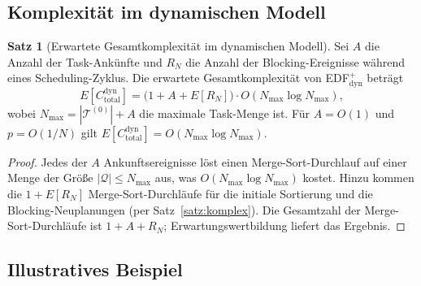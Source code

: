 ﻿\documentclass[a4paper,12pt]{article}
\theoremstyle{definition}
\newtheorem{satz}{Satz}
\begin{document}
	\subsection{Komplexität im dynamischen Modell}

	\begin{satz}[Erwartete Gesamtkomplexität im dynamischen Modell]
		\label{satz:komplex_dyn}
		Sei $A$ die Anzahl der Task-Ankünfte und $R_N$ die Anzahl der Blocking-Ereignisse
		während eines Scheduling-Zyklus. Die erwartete Gesamtkomplexität von
		EDF$^+_{\mathrm{dyn}}$ beträgt
		\[
		E[C_{\mathrm{total}}^{\mathrm{dyn}}] = \bigl(1 + A + E[R_N]\bigr) \cdot O(N_{\max}\log N_{\max}),
		\]
		wobei $N_{\max} = |\mathcal{T}^{(0)}| + A$ die maximale Task-Menge ist.
		Für $A = O(1)$ und $p = O(1/N)$ gilt
		$E[C_{\mathrm{total}}^{\mathrm{dyn}}] = O(N_{\max}\log N_{\max})$.
	\end{satz}

	\begin{proof}
		Jedes der $A$ Ankunftsereignisse löst einen Merge-Sort-Durchlauf auf einer
		Menge der Grö\ss{}e $|\mathcal{Q}| \le N_{\max}$ aus, was $O(N_{\max}\log N_{\max})$
		kostet. Hinzu kommen die $1 + E[R_N]$ Merge-Sort-Durchläufe für die initiale
		Sortierung und die Blocking-Neuplanungen (per Satz~\ref{satz:komplex}). Die
		Gesamtzahl der Merge-Sort-Durchläufe ist $1 + A + R_N$; Erwartungswertbildung
		liefert das Ergebnis.
	\end{proof}

	\subsection{Illustratives Beispiel}
\end{document}
